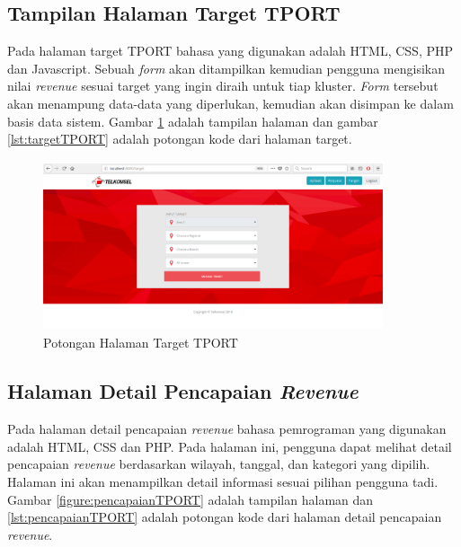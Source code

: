 

\subsection{Tampilan Halaman Target TPORT}
Pada halaman target TPORT bahasa yang digunakan adalah HTML, CSS, PHP dan Javascript. Sebuah \textit{form} akan ditampilkan kemudian pengguna mengisikan nilai \textit{revenue} sesuai target yang ingin diraih untuk tiap kluster. \textit{Form} tersebut akan menampung data-data yang diperlukan, kemudian akan disimpan ke dalam basis data sistem. Gambar \ref{figure:targetTPORT} adalah tampilan halaman dan gambar \ref{lst:targetTPORT} adalah potongan kode dari halaman target.



\begin{figure}[h!]
	\centerline
	{\includegraphics[width=10cm,height=5cm]{bab5/tampilanTarget.png}}
	\caption{Potongan Halaman Target TPORT}
	\label{figure:targetTPORT}
\end{figure}

\subsection{Halaman Detail Pencapaian \textit{Revenue}}
Pada halaman detail pencapaian \textit{revenue} bahasa pemrograman yang digunakan adalah HTML, CSS dan PHP. Pada halaman ini, pengguna dapat melihat detail pencapaian \textit{revenue} berdasarkan wilayah, tanggal, dan kategori yang dipilih. Halaman ini akan menampilkan detail informasi sesuai pilihan pengguna tadi. Gambar \ref{figure:pencapaianTPORT} adalah tampilan halaman dan \ref{lst:pencapaianTPORT} adalah potongan kode dari halaman detail pencapaian \textit{revenue}.


